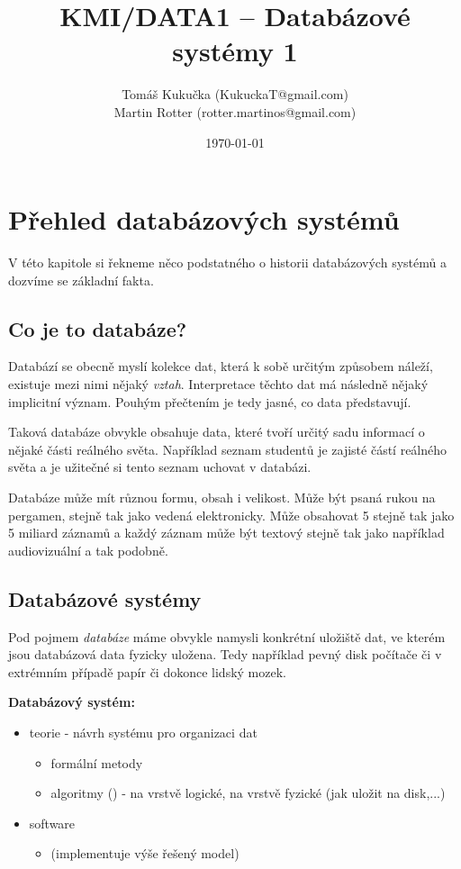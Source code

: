 \documentclass[10pt, a4paper, titlepage]{article}
\title{KMI/DATA1  -- Databázové systémy 1}
\author{Tomáš Kukučka (KukuckaT@gmail.com)\\Martin Rotter (rotter.martinos@gmail.com)}
\date{\today}
\theoremstyle{note}
\begin{document}
\maketitle

\section{Přehled databázových systémů}
V této kapitole si řekneme něco podstatného o historii databázových systémů a dozvíme se základní fakta.

\subsection{Co je to databáze?}
Databází se obecně myslí kolekce dat, která k sobě určitým způsobem náleží, existuje mezi nimi nějaký \emph{vztah}. Interpretace těchto dat má následně nějaký implicitní význam. Pouhým přečtením je tedy jasné, co data představují.

Taková databáze obvykle obsahuje data, které tvoří určitý sadu informací o nějaké části reálného světa. Například seznam studentů je zajisté částí reálného světa a je užitečné si tento seznam uchovat v databázi.

Databáze může mít různou formu, obsah i velikost. Může být psaná rukou na pergamen, stejně tak jako vedená elektronicky. Může obsahovat 5 stejně tak jako 5 miliard záznamů a každý záznam může být textový stejně tak jako například audiovizuální a tak podobně.

\subsection{Databázové systémy}
Pod pojmem \emph{databáze} máme obvykle namysli konkrétní uložiště dat, ve kterém jsou databázová data fyzicky uložena. Tedy například pevný disk počítače či v extrémním případě papír či dokonce lidský mozek.

\textbf{Databázový systém:}
\begin{itemize}
	\item teorie - návrh systému pro organizaci dat
	\begin{itemize}
		\item formální metody
		\item algoritmy () - na vrstvě logické, na vrstvě fyzické (jak uložit na disk,...)
	\end{itemize}
	\item software
	\begin{itemize}
		\item {} (implementuje výše řešený model)
	\end{itemize}
\end{itemize}
\end{document}

